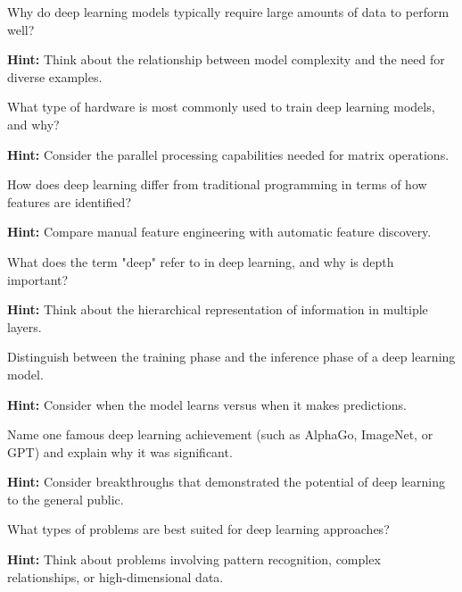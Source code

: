 \begin{problem}
Why do deep learning models typically require large amounts of data to perform well?

\textbf{Hint:} Think about the relationship between model complexity and the need for diverse examples.
\end{problem}

\begin{problem}
What type of hardware is most commonly used to train deep learning models, and why?

\textbf{Hint:} Consider the parallel processing capabilities needed for matrix operations.
\end{problem}

\begin{problem}
How does deep learning differ from traditional programming in terms of how features are identified?

\textbf{Hint:} Compare manual feature engineering with automatic feature discovery.
\end{problem}

\begin{problem}
What does the term "deep" refer to in deep learning, and why is depth important?

\textbf{Hint:} Think about the hierarchical representation of information in multiple layers.
\end{problem}

\begin{problem}
Distinguish between the training phase and the inference phase of a deep learning model.

\textbf{Hint:} Consider when the model learns versus when it makes predictions.
\end{problem}

\begin{problem}
Name one famous deep learning achievement (such as AlphaGo, ImageNet, or GPT) and explain why it was significant.

\textbf{Hint:} Consider breakthroughs that demonstrated the potential of deep learning to the general public.
\end{problem}

\begin{problem}
What types of problems are best suited for deep learning approaches?

\textbf{Hint:} Think about problems involving pattern recognition, complex relationships, or high-dimensional data.
\end{problem}

